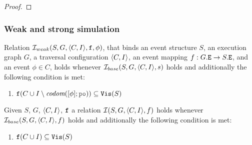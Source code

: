 \documentclass[12pt]{article}
\begin{document}
\begin{proof}






    
\end{proof}

\subsubsection{Weak and strong simulation}

\begin{definition}
  Relation $\mathcal{I}_{weak}(S, G, \langle C, I \rangle, {\mathtt{f}}, \phi)$, that binds an 
  event structure $S$, an \imm execution graph $G$,
  a traversal configuration $\langle C, I \rangle$,
  an event mapping $f : G.{\mathtt{E}} \rightarrow S.{\mathtt{E}}$,
  and an event $\phi \in C$,
  holds whenever $\mathcal{I}_{base}(S, G, \langle C, I \rangle, s)$ holds and
  additionally the following condition is met:
  \begin{enumerate}[label=\textbf{S$_{weak}$.\arabic*},start=8]
     
    \item \label{item:sim-vis-weak}
      $\lf(C \cup I \setminus \codom{[\phi];\lPO}) \subseteq \lVIS(S)$

  \end{enumerate}
\end{definition}

\begin{definition}
  Given $S$, $G$, $\langle C, I \rangle$, ${\mathtt{f}}$ a relation $\mathcal{I}(S, G, \langle C, I \rangle, f)$ holds
  whenever $\mathcal{I}_{base}(S, G, \langle C, I \rangle, f)$ holds and additionally
  the following condition is met:
  \begin{enumerate}[label=\textbf{S.\arabic*},start=8]
    \item \label{item:sim-vis}
       ${\mathtt{f}}(C \cup I) \subseteq {\mathtt{Vis}}(S)$
  \end{enumerate}
\end{definition}
\end{document}

